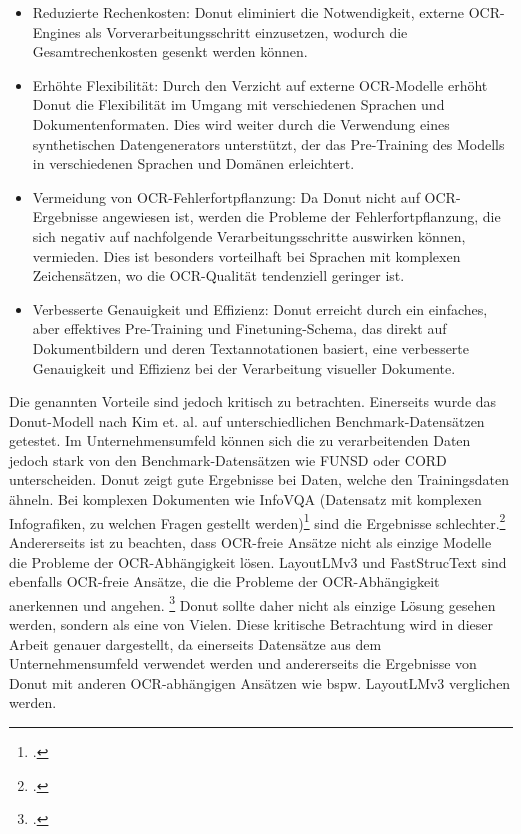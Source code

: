 \begin{itemize}
    \item Reduzierte Rechenkosten: Donut eliminiert die Notwendigkeit, externe OCR-Engines als Vorverarbeitungsschritt einzusetzen, wodurch die Gesamtrechenkosten gesenkt werden können.
    \item Erhöhte Flexibilität: Durch den Verzicht auf externe OCR-Modelle erhöht Donut die Flexibilität im Umgang mit verschiedenen Sprachen und Dokumentenformaten. Dies wird weiter durch die Verwendung eines synthetischen Datengenerators unterstützt, der das Pre-Training des Modells in verschiedenen Sprachen und Domänen erleichtert.
    \item Vermeidung von OCR-Fehlerfortpflanzung: Da Donut nicht auf OCR-Ergebnisse angewiesen ist, werden die Probleme der Fehlerfortpflanzung, die sich negativ auf nachfolgende Verarbeitungsschritte auswirken können, vermieden. Dies ist besonders vorteilhaft bei Sprachen mit komplexen Zeichensätzen, wo die OCR-Qualität tendenziell geringer ist.
    \item Verbesserte Genauigkeit und Effizienz: Donut erreicht durch ein einfaches, aber effektives Pre-Training und Finetuning-Schema, das direkt auf Dokumentbildern und deren Textannotationen basiert, eine verbesserte Genauigkeit und Effizienz bei der Verarbeitung visueller Dokumente.
\end{itemize}
Die genannten Vorteile sind jedoch kritisch zu betrachten. Einerseits wurde das Donut-Modell nach Kim et. al. auf unterschiedlichen Benchmark-Datensätzen getestet. Im Unternehmensumfeld können sich die zu verarbeitenden Daten jedoch stark von den Benchmark-Datensätzen wie \ac{FUNSD} oder \ac{CORD} unterscheiden. Donut zeigt gute Ergebnisse bei Daten, welche den Trainingsdaten ähneln. Bei komplexen Dokumenten wie InfoVQA (Datensatz mit komplexen Infografiken, zu welchen Fragen gestellt werden)\footcites[Vgl. dazu ausführlich][]{mathew_infographicvqa_2021} sind die Ergebnisse schlechter.\footcites[Vgl.][S. 693]{aggarwal_dublin_2023} Andererseits ist zu beachten, dass OCR-freie Ansätze nicht als einzige Modelle die Probleme der OCR-Abhängigkeit lösen. LayoutLMv3 und FastStrucText sind ebenfalls OCR-freie Ansätze, die die Probleme der OCR-Abhängigkeit anerkennen und angehen. \footcites[Vgl. dazu ausführlich][]{huang_layoutlmv3_2022,zhai_fast-structext_2023} Donut sollte daher nicht als einzige Lösung gesehen werden, sondern als eine von Vielen. Diese kritische Betrachtung wird in dieser Arbeit genauer dargestellt, da einerseits Datensätze aus dem Unternehmensumfeld verwendet werden und andererseits die Ergebnisse von Donut mit anderen OCR-abhängigen Ansätzen wie bspw. LayoutLMv3 verglichen werden.

